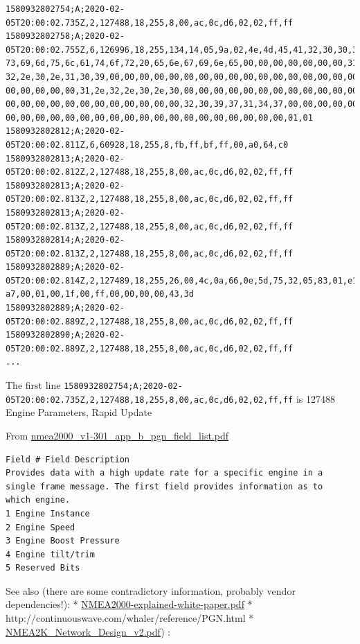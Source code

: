 \documentclass[11pt]{article}
\begin{document}
    \begin{verbatim}
1580932802754;A;2020-02-05T20:00:02.735Z,2,127488,18,255,8,00,ac,0c,d6,02,02,ff,ff
1580932802758;A;2020-02-05T20:00:02.755Z,6,126996,18,255,134,14,05,9a,02,4e,4d,45,41,32,30,30,30,20,
73,69,6d,75,6c,61,74,6f,72,20,65,6e,67,69,6e,65,00,00,00,00,00,00,00,31,2e,
32,2e,30,2e,31,30,39,00,00,00,00,00,00,00,00,00,00,00,00,00,00,00,00,00,00,
00,00,00,00,00,31,2e,32,2e,30,2e,30,00,00,00,00,00,00,00,00,00,00,00,00,00,
00,00,00,00,00,00,00,00,00,00,00,00,32,30,39,37,31,34,37,00,00,00,00,00,00,
00,00,00,00,00,00,00,00,00,00,00,00,00,00,00,00,00,00,00,01,01
1580932802812;A;2020-02-05T20:00:02.811Z,6,60928,18,255,8,fb,ff,bf,ff,00,a0,64,c0
1580932802813;A;2020-02-05T20:00:02.812Z,2,127488,18,255,8,00,ac,0c,d6,02,02,ff,ff
1580932802813;A;2020-02-05T20:00:02.813Z,2,127488,18,255,8,00,ac,0c,d6,02,02,ff,ff
1580932802813;A;2020-02-05T20:00:02.813Z,2,127488,18,255,8,00,ac,0c,d6,02,02,ff,ff
1580932802814;A;2020-02-05T20:00:02.813Z,2,127488,18,255,8,00,ac,0c,d6,02,02,ff,ff
1580932802889;A;2020-02-05T20:00:02.814Z,2,127489,18,255,26,00,4c,0a,66,0e,5d,75,32,05,83,01,e1,d9,
a7,00,01,00,1f,00,ff,00,00,00,00,43,3d
1580932802889;A;2020-02-05T20:00:02.889Z,2,127488,18,255,8,00,ac,0c,d6,02,02,ff,ff
1580932802890;A;2020-02-05T20:00:02.889Z,2,127488,18,255,8,00,ac,0c,d6,02,02,ff,ff
...
\end{verbatim}

    The first line
\texttt{1580932802754;A;2020-02-05T20:00:02.735Z,2,127488,18,255,8,00,ac,0c,d6,02,02,ff,ff}
is 127488 Engine Parameters, Rapid Update

    From
\href{http://www.nmea.org/Assets/july\%202010\%20nmea2000_v1-301_app_b_pgn_field_list.pdf}{nmea2000\_v1-301\_app\_b\_pgn\_field\_list.pdf}

\begin{verbatim}
Field # Field Description
Provides data with a high update rate for a specific engine in a single frame message. The first field provides information as to
which engine.
1 Engine Instance
2 Engine Speed
3 Engine Boost Pressure
4 Engine tilt/trim
5 Reserved Bits
\end{verbatim}

See also (there are some contradictory information, probably vendor
dependencies!): *
\href{https://www.nmea.org/Assets/20090423\%20rtcm\%20white\%20paper\%20nmea\%202000.pdf}{NMEA2000-explained-white-paper.pdf}
* http://continuouswave.com/whaler/reference/PGN.html *
\href{http://data.over-blog-kiwi.com/0/54/01/67/20151122/ob_f92436_nmea2k-network-design-v2.pdf}{NMEA2K\_Network\_Design\_v2.pdf})
:
\end{document}
